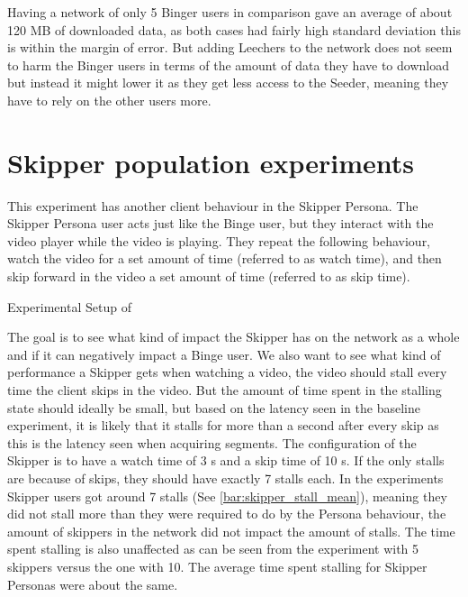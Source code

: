 \if{}

\fi

Having a network of only 5 Binger users in comparison gave an average of about 120 \ac{MB} of downloaded data, as both cases had fairly high standard deviation this is within the margin of error. But adding Leechers to the network does not seem to harm the Binger users in terms of the amount of data they have to download but instead it might lower it as they get less access to the Seeder, meaning they have to rely on the other users more.

\FloatBarrier \section{Skipper population experiments}
\label{sec:eval_skipper}
This experiment has another client behaviour in the Skipper Persona.
The Skipper Persona user acts just like the Binge user, but they interact with the video player while the video is playing. They repeat the following behaviour, watch the video for a set amount of time (referred to as watch time), and then skip forward in the video a set amount of time (referred to as skip time).

\begin{table}[!htbp]
\myfloatalign
\caption[Experimental Setup of Skipper]{Experimental Setup of }
\label{tab:exp_overview_skipper}

\end{table}


The goal is to see what kind of impact the Skipper has on the network as a whole and if it can negatively impact a Binge user. We also want to see what kind of performance a Skipper gets when watching a video, the video should stall every time the client skips in the video. But the amount of time spent in the stalling state should ideally be small, but based on the latency seen in the baseline experiment, it is likely that it stalls for more than a second after every skip as this is the latency seen when acquiring segments. The configuration of the Skipper is to have a watch time of 3 \ac{s} and a skip time of 10 \ac{s}. If the only stalls are because of skips, they should have exactly 7 stalls each.
In the experiments Skipper users got around 7 stalls (See \autoref{bar:skipper_stall_mean}), meaning they did not stall more than they were required to do by the Persona behaviour, the amount of skippers in the network did not impact the amount of stalls. The time spent stalling is also unaffected as can be seen from the experiment with 5 skippers versus the one with 10. The average time spent stalling for Skipper Personas were about the same.

